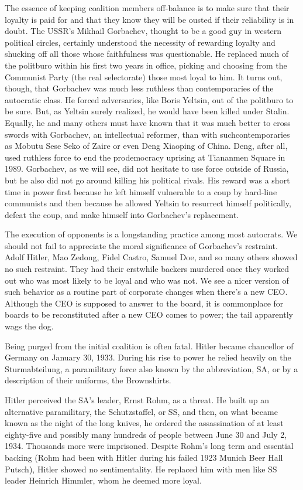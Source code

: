 \documentclass[10pt]{article}
\begin{document}
{\large The essence of keeping coalition members off-balance is to make sure
that their loyalty is paid for and that they know they will be ousted if their
reliability is in doubt. The USSR's Mikhail Gorbachev, thought to be a good guy
in western political circles, certainly understood the necessity of rewarding
loyalty and shucking off all those whose faithfulness was questionable. He
replaced much of the politburo within his first two years in office, picking and
choosing from the Communist Party (the real selectorate) those most loyal to him.
It turns out, though, that Gorbachev was much less ruthless than contemporaries
of the autocratic class. He forced adversaries, like Boris Yeltsin, out of the
politburo to be sure. But, as Yeltsin surely realized, he would have been killed
under Stalin. Equally, he and many others must have known that it was much better
to cross swords with Gorbachev, an intellectual reformer, than with
suchcontemporaries as Mobutu Sese Seko of Zaire or even Deng Xiaoping of China.
Deng, after all, used ruthless force to end the prodemocracy uprising at
Tiananmen Square in 1989. Gorbachev, as we will see, did not hesitate to use
force outside of Russia, but he also did not go around killing his political
rivals. His reward was a short time in power first because he left himself
vulnerable to a coup by hard-line communists and then because he allowed Yeltsin
to resurrect himself politically, defeat the coup, and make himself into
Gorbachev's replacement.}

{\large The execution of opponents is a longstanding practice among most
autocrats. We should not fail to appreciate the moral significance of Gorbachev's
restraint. Adolf Hitler, Mao Zedong, Fidel Castro, Samuel Doe, and so many others
showed no such restraint. They had their erstwhile backers murdered once they
worked out who was most likely to be loyal and who was not. We see a nicer
version of such behavior as a routine part of corporate changes when there's a
new CEO. Although the CEO is supposed to answer to the board, it is commonplace
for boards to be reconstituted after a new CEO comes to power; the tail
apparently wags the dog.}

{\large Being purged from the initial coalition is often fatal. Hitler became
chancellor of Germany on January 30, 1933. During his rise to power he relied
heavily on the Sturmabteilung, a paramilitary force also known by the
abbreviation, SA, or by a description of their uniforms, the Brownshirts.}

{\large Hitler perceived the SA's leader, Ernst Rohm, as a threat. He built up
an alternative paramilitary, the Schutzstaffel, or SS, and then, on what became
known as the night of the long knives, he ordered the assassination of at least
eighty-five and possibly many hundreds of people between June 30 and July 2,
1934. Thousands more were imprisoned. Despite Rohm's long term and essential
backing (Rohm had been with Hitler during his failed 1923 Munich Beer Hall
Putsch), Hitler showed no sentimentality. He replaced him with men like SS leader
Heinrich Himmler, whom he deemed more loyal.}
\end{document}
